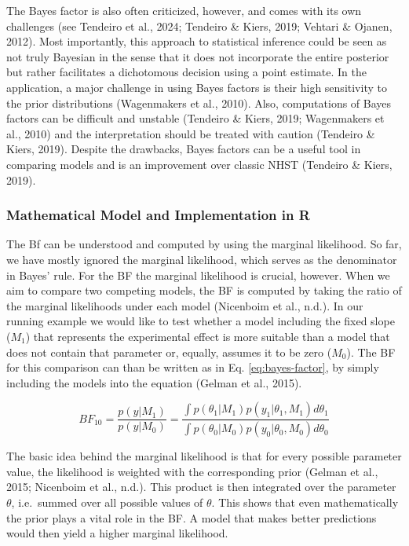 \documentclass[
  doc,12pt,floatsintext]{apa7}
\begin{document}
The Bayes factor is also often criticized, however, and comes with its own challenges (see Tendeiro et al., 2024; Tendeiro \& Kiers, 2019; Vehtari \& Ojanen, 2012). Most importantly, this approach to statistical inference could be seen as not truly Bayesian in the sense that it does not incorporate the entire posterior but rather facilitates a dichotomous decision using a point estimate. In the application, a major challenge in using Bayes factors is their high sensitivity to the prior distributions (Wagenmakers et al., 2010). Also, computations of Bayes factors can be difficult and unstable (Tendeiro \& Kiers, 2019; Wagenmakers et al., 2010) and the interpretation should be treated with caution (Tendeiro \& Kiers, 2019). Despite the drawbacks, Bayes factors can be a useful tool in comparing models and is an improvement over classic NHST (Tendeiro \& Kiers, 2019).

\subsubsection{Mathematical Model and Implementation in R}\label{mathematical-model-and-implementation-in-r-2}

The Bf can be understood and computed by using the marginal likelihood. So far, we have mostly ignored the marginal likelihood, which serves as the denominator in Bayes' rule. For the BF the marginal likelihood is crucial, however. When we aim to compare two competing models, the BF is computed by taking the ratio of the marginal likelihoods under each model (Nicenboim et al., n.d.). In our running example we would like to test whether a model including the fixed slope (\(M_1\)) that represents the experimental effect is more suitable than a model that does not contain that parameter or, equally, assumes it to be zero (\(M_0\)). The BF for this comparison can than be written as in Eq. \eqref{eq:bayes-factor}, by simply including the models into the equation (Gelman et al., 2015).

\begin{equation}
BF_{10} = \frac{p(y|M_1)}{p(y|M_0)} = \frac{\int{p(\theta_1|M_1)p(y_1|\theta_1,M_1)}d\theta_1}{\int{p(\theta_0|M_0)p(y_0|\theta_0,M_0)}d\theta_0}
\label{eq:bayes-factor}
\end{equation}

The basic idea behind the marginal likelihood is that for every possible parameter value, the likelihood is weighted with the corresponding prior (Gelman et al., 2015; Nicenboim et al., n.d.). This product is then integrated over the parameter \(\theta\), i.e.~summed over all possible values of \(\theta\). This shows that even mathematically the prior plays a vital role in the BF. A model that makes better predictions would then yield a higher marginal likelihood.
\end{document}
